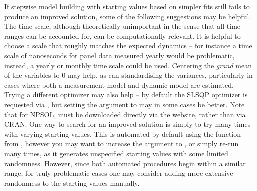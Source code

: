 \documentclass[nojss]{jss}\usepackage[]{graphicx}\usepackage[]{color}
\begin{document}
If stepwise model building with starting values based on simpler fits still fails to produce an improved solution, some of the following suggestions may be helpful.
The time scale, although theoretically unimportant in the sense that all time ranges can be accounted for, can be computationally relevant. It is helpful to choose a scale that roughly matches the expected dynamics -- for instance a time scale of nanoseconds for panel data measured yearly would be problematic, instead, a yearly or monthly time scale could be used. 
Centering the \textit{grand} mean of the variables to 0 may help, as can standardising the variances, particularly in cases where both a measurement model and dynamic model are estimated. Trying a different optimizer may also help -- by default the SLSQP optimizer is requested via , but setting the argument  to  may in some cases be better. Note that for NPSOL,  must be downloaded directly via the  website, rather than via CRAN. 
One way to search for an improved solution is simply to try many times with varying starting values. This is automated by default using the  function from , however you may want to increase the  argument to , or simply re-run  many times, as it generates unspecified starting values with some limited randomness.  However, since both automated procedures begin within a similar range, for truly problematic cases one may consider adding more extensive randomness to the starting values manually.
\end{document}
